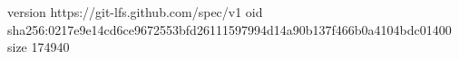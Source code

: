 version https://git-lfs.github.com/spec/v1
oid sha256:0217e9e14cd6ce9672553bfd26111597994d14a90b137f466b0a4104bdc01400
size 174940

